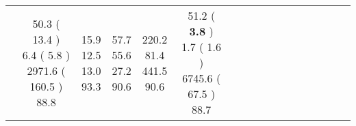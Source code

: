 \documentclass[9pt]{article}
\begin{document}
\begin{landscape}
\begin{longtable}{ l | c c c c | c c c c | c c c c | c c c c |}
 &
                    
                            \makecell{              50.3
     (             13.4
    ) \\
            {\footnotesize             6.4
     (              5.8
     )} \\
            {\footnotesize             2971.6
     (            160.5
    ) } \\
            {\small  \textcolor[rgb]{ 0.424 , 0.476 , 0.1} {88.8  }
} }


             &
                            \makecell{              15.9
     \\
            {\footnotesize             12.5
    } \\  {\footnotesize             13.0
     } \\
            {\small \textcolor[rgb]{ 0.334 , 0.565 , 0.1} {93.3  }
} }
             &                         \makecell{              57.7
     \\
            {\footnotesize             55.6
    } \\  {\footnotesize             27.2
     } \\
            {\small \textcolor[rgb]{ 0.388 , 0.512 , 0.1} {90.6  }
} }
             &
                            \makecell{              220.2
     \\
            {\footnotesize             81.4
    } \\  {\footnotesize             441.5
     } \\
            {\small \textcolor[rgb]{ 0.388 , 0.512 , 0.1} {90.6  }
} }
            

 & 
                            \makecell{              51.2
     (             \textbf{ 3.8 }
    ) \\
            {\footnotesize             1.7
     (              1.6
     )} \\
            {\footnotesize             6745.6
     (            67.5
    ) } \\
            {\small  \textcolor[rgb]{ 0.426 , 0.474 , 0.1} {88.7  }
} }



\end{longtable}
\end{landscape}
\end{document}

